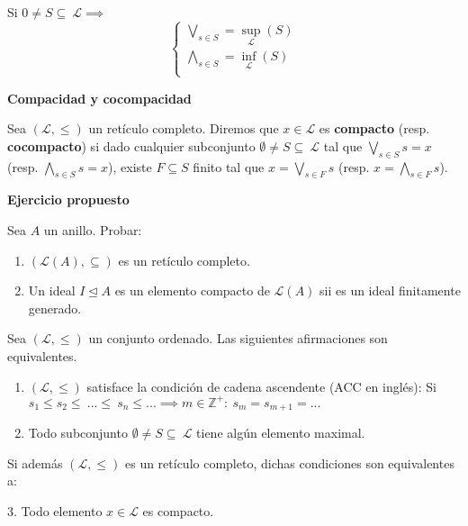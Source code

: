 \documentclass[openany]{book}
\begin{document}
    Si $ 0 \ne S \subseteq\ \mathcal{L} \implies $
    $$ \left\{
    \begin{array}{l}
        \bigvee_{s \in S} = \sup_{\mathcal{L}}(S)\\ 
        \bigwedge_{s \in S} = \inf_{\mathcal{L}}(S)\\ 
    \end{array}
    \right. $$

\begin{definition}
    \textbf{Compacidad y cocompacidad}

    Sea $ (\mathcal{L},\leq ) $ un retículo completo. Diremos que $x \in \mathcal{L} $ es \textbf{compacto} (resp. \textbf{cocompacto}) si dado cualquier subconjunto $ \emptyset \ne S \subseteq\ \mathcal{L} $ tal que $ \bigvee_{s \in S} s = x $ (resp. $ \bigwedge_{s \in S}s = x $), existe $ F \subseteq S $ finito tal que $ x = \bigvee_{s \in F} s $ (resp. $ x = \bigwedge_{s \in F}s $).
\end{definition}

\setcounter{ex}{0}

\begin{exercise}
    \textbf{Ejercicio propuesto}

    Sea $ A $ un anillo. Probar:
    \begin{enumerate}
        \item $ (\mathcal{L}(A),\subseteq ) $ es un retículo completo.
        \item Un ideal $ I \unlhd A $ es un elemento compacto de $ \mathcal{L}(A) $ sii es un ideal finitamente generado.
    \end{enumerate}
\end{exercise}

\begin{proposition}
    Sea $ (\mathcal{L},\leq ) $ un conjunto ordenado. Las siguientes afirmaciones son equivalentes.
    \begin{enumerate}
        \item $ (\mathcal{L},\leq ) $ satisface la condición de cadena ascendente (ACC en inglés): Si $ s_1\leq s_2 \leq\ ... \leq\ s_n\leq ... \implies m \in \mathbb{Z}^{+}:\ s_m=s_{m+1}=...$ 
        \item Todo subconjunto $ \emptyset \ne S \subseteq\ \mathcal{L} $ tiene algún elemento maximal.
    \end{enumerate}
    
    Si además $ (\mathcal{L},\leq ) $ es un retículo completo, dichas condiciones son equivalentes a:

    3. Todo elemento $ x \in \mathcal{L} $ es compacto.
\end{proposition}
\end{document}

